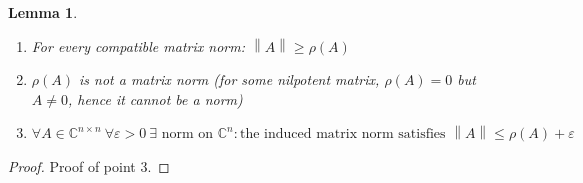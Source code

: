 \documentclass{article}
\newtheorem{lemma}{Lemma}  \numberwithin{lemma}{section}
\newcommand{\norm}[1]{\left\|#1\right\|}
\begin{document}
\begin{lemma} %
  \begin{enumerate}
    \item For every compatible matrix norm: $\norm{A} \geq \rho(A)$
    \item $\rho(A)$ is not a matrix norm (for some nilpotent matrix, $\rho(A) = 0$ but $A \neq 0$, hence it cannot be a norm)
    \item $\forall A \in \mathbb C^{n \times n} \: \forall \varepsilon > 0 \:\exists \text{ norm on } \mathbb C^n: \text{the induced matrix norm satisfies } \norm{A} \leq \rho(A) + \varepsilon$
  \end{enumerate}
\end{lemma}

\begin{proof}
  Proof of point 3.


\end{proof}
\end{document}
